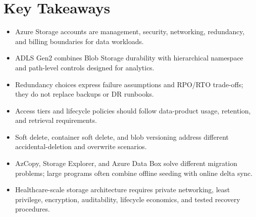 \section*{Key Takeaways}
\begin{itemize}
    \item Azure Storage accounts are management, security, networking, redundancy, and billing boundaries for data workloads.
    \item ADLS Gen2 combines Blob Storage durability with hierarchical namespace and path-level controls designed for analytics.
    \item Redundancy choices express failure assumptions and RPO/RTO trade-offs; they do not replace backups or DR runbooks.
    \item Access tiers and lifecycle policies should follow data-product usage, retention, and retrieval requirements.
    \item Soft delete, container soft delete, and blob versioning address different accidental-deletion and overwrite scenarios.
    \item AzCopy, Storage Explorer, and Azure Data Box solve different migration problems; large programs often combine offline seeding with online delta sync.
    \item Healthcare-scale storage architecture requires private networking, least privilege, encryption, auditability, lifecycle economics, and tested recovery procedures.
\end{itemize}


